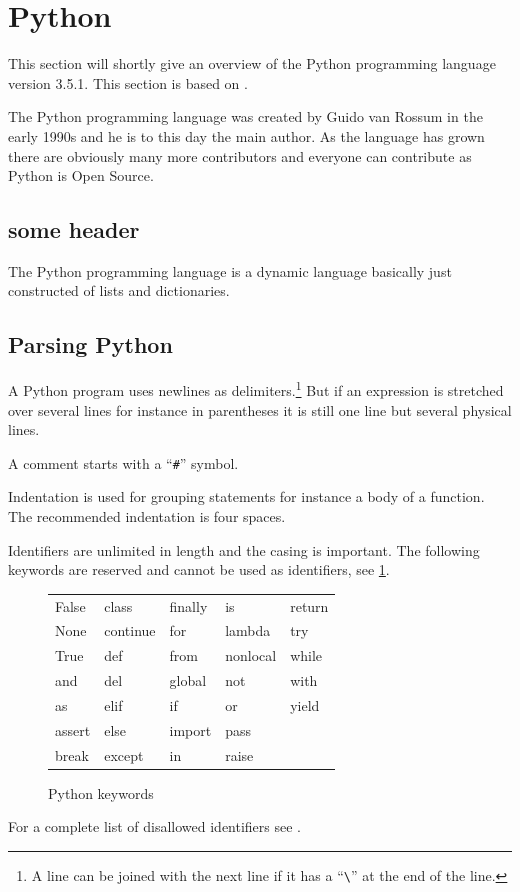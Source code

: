 \section{Python}\label{python}
This section will shortly give an overview of the Python programming language version 3.5.1.
This section is based on \citet{python_docs}.

The Python programming language was created by Guido van Rossum in the early 1990s and he is to this day the main author.
As the language has grown there are obviously many more contributors and everyone can contribute as Python is Open Source.

\subsection{some header}
The Python programming language is a dynamic language basically just constructed of lists and dictionaries.

\subsection{Parsing Python}
A Python program uses newlines as delimiters.\footnote{A line can be joined with the next line if it has a ``\texttt{\textbackslash}'' at the end of the line.}
But if an expression is stretched over several lines for instance in parentheses it is still one line but several physical lines.

A comment starts with a ``\texttt{\#}'' symbol.

Indentation is used for grouping statements for instance a body of a function.
The recommended indentation is four spaces.



Identifiers are unlimited in length and the casing is important.
The following keywords are reserved and cannot be used as identifiers, see \cref{python:keywords_tabular}.
\begin{figure}
  \centering
  \begin{tabular}{l l l l l}
    False & class & finally & is & return \\
None   &    continue &  for     &   lambda  &   try \\
True   &    def     &   from     &  nonlocal &  while \\
and    &    del     &   global   &  not      &  with \\
as     &    elif    &   if        & or       &  yield \\
assert  &   else    &   import   &  pass \\
break   &   except  &   in      &   raise \\
  \end{tabular}
  \caption{Python keywords}
  \label{python:keywords_tabular}
\end{figure}
For a complete list of disallowed identifiers see \citet{python_docs}.

